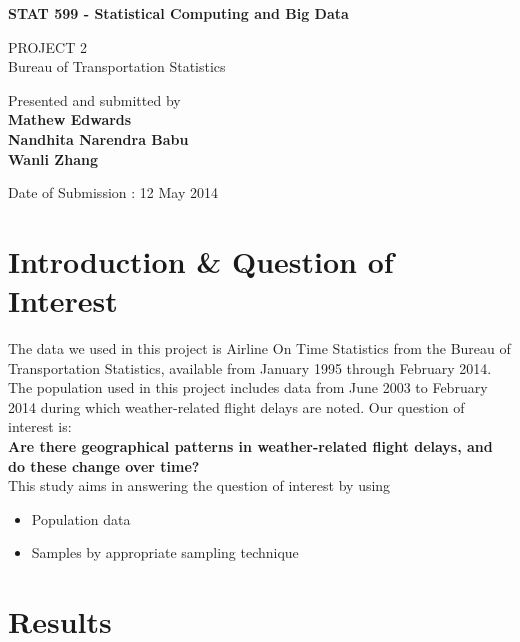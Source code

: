 \documentclass{article}
\begin{document}
\begin{titlepage}
    \begin{center}
        \vspace*{1cm}
        
        \Huge
        \textbf{STAT 599 - Statistical Computing and Big Data}
        
        \vspace{1cm}
        \LARGE
        PROJECT 2\\
        Bureau of Transportation Statistics
        
        \vspace{8cm}
        Presented and submitted by \\
        \textbf{Mathew Edwards} \\
        \textbf{Nandhita Narendra Babu} \\
        \textbf{Wanli Zhang}
        
        \vspace{0.5cm}
        Date of Submission : 12 May 2014
        
       
        
    \end{center}
\end{titlepage}



\section{Introduction \& Question of Interest}
The data we used in this project is Airline On Time Statistics from the Bureau of Transportation Statistics, available from January 1995 through February 2014. The population used in this project includes data from June 2003 to February 2014 during which weather-related flight delays are noted. Our question of interest is:\\
\textbf{Are there geographical patterns in weather-related flight delays, and do these change over time?}\\
This study aims in answering the question of interest by using
\begin{itemize}
\item Population data
\item Samples by appropriate sampling technique
\end{itemize}

\section{Results}
\end{document}
